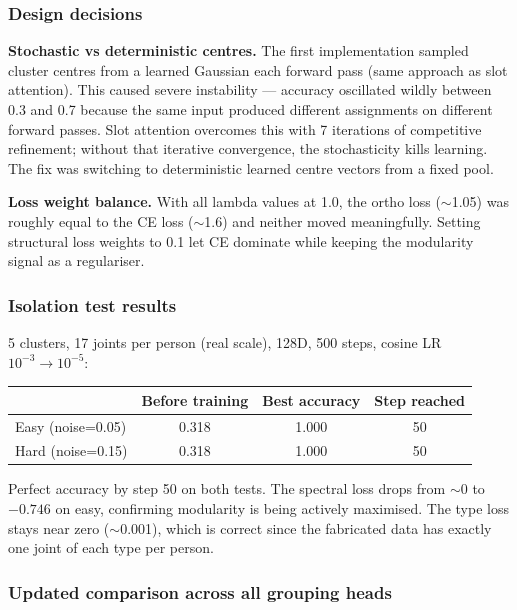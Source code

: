 \subsubsection{Design decisions}

\textbf{Stochastic vs deterministic centres.} The first implementation sampled cluster centres from a learned Gaussian each forward pass (same approach as slot attention). This caused severe instability --- accuracy oscillated wildly between 0.3 and 0.7 because the same input produced different assignments on different forward passes. Slot attention overcomes this with 7 iterations of competitive refinement; without that iterative convergence, the stochasticity kills learning. The fix was switching to deterministic learned centre vectors from a fixed pool.

\textbf{Loss weight balance.} With all lambda values at 1.0, the ortho loss ($\sim$1.05) was roughly equal to the CE loss ($\sim$1.6) and neither moved meaningfully. Setting structural loss weights to 0.1 let CE dominate while keeping the modularity signal as a regulariser.


\subsubsection{Isolation test results}

5 clusters, 17 joints per person (real scale), 128D, 500 steps, cosine LR $10^{-3} \to 10^{-5}$:

\begin{center}
\begin{tabular}{lccc}
\toprule
 & Before training & Best accuracy & Step reached \\
\midrule
Easy (noise=0.05) & 0.318 & 1.000 & 50 \\
Hard (noise=0.15) & 0.318 & 1.000 & 50 \\
\bottomrule
\end{tabular}
\end{center}

Perfect accuracy by step 50 on both tests. The spectral loss drops from $\sim$0 to $-0.746$ on easy, confirming modularity is being actively maximised. The type loss stays near zero ($\sim$0.001), which is correct since the fabricated data has exactly one joint of each type per person.


\subsubsection{Updated comparison across all grouping heads}

